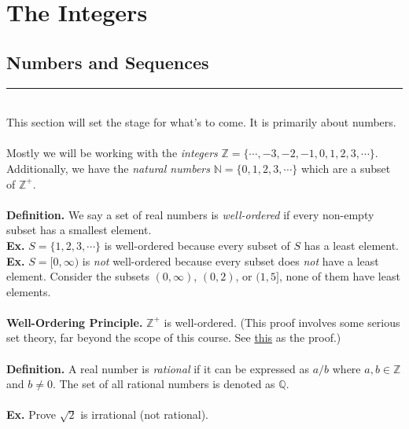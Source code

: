\documentclass[class=article, crop=false]{standalone}
\begin{document}
    
\section{The Integers}

\subsection{Numbers and Sequences}
\rule{\textwidth}{1pt}\\
This section will set the stage for what's to come. It is primarily about numbers.\\\\
Mostly we will be working with the \emph{integers} $\mathbb{Z} = \{\cdots, -3,-2,-1,0,1,2,3,\cdots\}$.
Additionally, we have the \emph{natural numbers} $\mathbb{N} = \{0,1,2,3,\cdots\}$ which are a subset of $\mathbb{Z}^+$.\\\\
\textbf{Definition.} We say a set of real numbers is \emph{well-ordered} if every non-empty subset has a smallest element.\\
\textbf{Ex.} $S = \{1,2,3,\cdots\}$ is well-ordered because every subset of $S$ has a least element.\\
\textbf{Ex.} $S = [0, \infty)$ is \emph{not} well-ordered because every subset does \emph{not} have a least element. 
Consider the subsets $(0,\infty)$, $(0,2)$, or $(1,5]$, none of them have least elements.\\\\
\textbf{Well-Ordering Principle.} $\mathbb{Z}^+$ is well-ordered. (This proof involves some serious set theory,
far beyond the scope of this course. See \href{https://math.berkeley.edu/~kpmann/Well-ordering.pdf}{this} as the proof.)\\\\
\textbf{Definition.} A real number is \emph{rational} if it can be expressed as $a/b$ where $a,b\in\mathbb{Z}$ and $b\neq 0$.
The set of all rational numbers is denoted as $\mathbb{Q}$.\\\\
\textbf{Ex.} Prove $\sqrt{2}$ is irrational (not rational).
\end{document}
